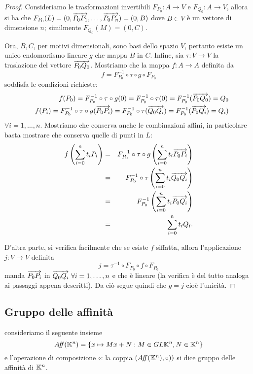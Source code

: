  \begin{proof}
 Consideriamo le trasformazioni invertibili $F_{P_0}:A\rightarrow V$ e $F_{Q_0}:A\rightarrow V$,
 allora si ha che $F_{P_0}(L)=(0,\overrightarrow{P_0P_1},\dots,\overrightarrow{P_0P_n})=(0,B)$ dove $B\in V$ è un vettore
 di dimensione $n$; similmente $F_{Q_0}(M)=(0,C).$
 
 Ora, $B,C$, per motivi dimensionali, sono basi dello spazio $V$, pertanto esiste un unico endomorfismo lineare
 $g$ che mappa $B$ in $C$. Infine, sia $\tau:V\rightarrow V$ la traslazione del vettore
 $\overrightarrow{P_0Q_0}$. Mostriamo che la mappa $f:A\rightarrow A$ definita da
 \[
	f = F_{P_0}^{-1} \circ \tau \circ g \circ F_{P_0}
 \]
 soddisfa le condizioni richieste:
 \begin{eqnarray*}
	&&f(P_0)=F_{P_0}^{-1} \circ \tau \circ g (0) = F_{P_0}^{-1} \circ \tau (0) = F_{P_0}^{-1} (\overrightarrow{P_0Q_0}) = Q_0\\
	&&f(P_i)=F_{P_0}^{-1} \circ \tau \circ g (\overrightarrow{P_0P_i}) = F_{P_0}^{-1} \circ \tau (\overrightarrow{Q_0Q_i}) = F_{P_0}^{-1} (\overrightarrow{P_0Q_i}) = Q_i)
 \end{eqnarray*}
 $\forall i=1,\dots,n.$
 Mostriamo che conserva anche le combinazioni affini, in particolare basta mostrare che conserva quelle di punti in $L$:
 \begin{eqnarray*}
	f\left(\sum_{i=0}^{n}t_iP_i\right)&=&F_{P_0}^{-1} \circ \tau \circ g \left(\sum_{i=0}^{n}t_i\overrightarrow{P_0P_i}\right)\\
	&=&F_{P_0}^{-1} \circ \tau \left( \sum_{i=0}^{n}t_i\overrightarrow{Q_0Q_i}\right) \\
	&=&F_{P_0}^{-1} \left(\sum_{i=0}^{n}t_i\overrightarrow{P_0Q_i}\right)\\
	&=&\sum_{i=0}^{n}t_iQ_i.
 \end{eqnarray*}
 
 D'altra parte, si verifica facilmente che se esiste $f$ siffatta, allora l'applicazione $j:V\rightarrow V$ 
 definita
 \[
	j = \tau^{-1} \circ F_{P_0} \circ f \circ F_{P_0}
 \]
 manda  $\overrightarrow{P_0P_i}$ in $\overrightarrow{Q_0Q_i}\ \forall i=1,\dots,n$
 e che è lineare (la verifica è del tutto analoga ai passaggi appena descritti). Da ciò segue quindi che  $g=j$ 
 cioè l'unicità.
 \end{proof}
 
	\subsection{Gruppo delle affinità}
 
 \begin{definition}
 consideriamo il seguente insieme
 \[
	A\!f\!\!f(\mathbb K^n)=\{x\mapsto Mx+N : M\in GL{\mathbb K^n}, N\in \mathbb K^n\}
 \]
 e l'operazione di composizione $\circ$: la coppia $(A\!f\!\!f(\mathbb K^n),\circ))$ si dice gruppo delle affinità di $\mathbb K^n$.
 \end{definition}
 
